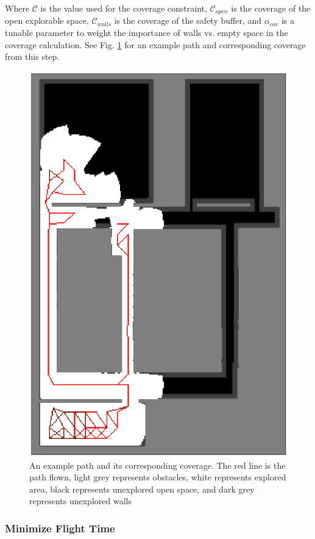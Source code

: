 \documentclass[letterpaper, 10 pt, conference]{ieeeconf}  %
\begin{document}
Where $\mathcal{C}$ is the value used for the coverage constraint, $\mathcal{C}_{open}$ is the coverage of the open explorable space, $\mathcal{C}_{walls}$ is the coverage of the safety buffer, and $\alpha_{cov}$ is a tunable parameter to weight the importance of walls vs. empty space in the coverage calculation. See Fig. \ref{fig:coverage} for an example path and corresponding coverage from this step.

\begin{figure}
\centering
\includegraphics[width=0.8\linewidth]{figures/coverage_map3.png}
\caption{An example path and its corresponding coverage. The red line is the path flown, light grey represents obstacles, white represents explored area, black represents unexplored open space, and dark grey represents unexplored walls}
\label{fig:coverage}
\end{figure}

\subsubsection{Minimize Flight Time}
\end{document}
